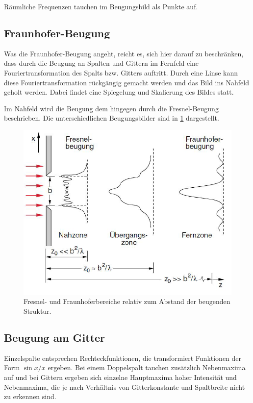 \documentclass[
	a4paper,
	12pt,
	pagesize,
	ngerman
]{scrartcl}
\begin{document}
	Räumliche Frequenzen tauchen im Beugungsbild als Punkte auf.

	\subsection{Fraunhofer-Beugung}
	\label{sec_fraunhofer}

	Was die Fraunhofer-Beugung angeht, reicht es, sich hier darauf zu beschränken, dass durch die Beugung an Spalten und Gittern im Fernfeld eine Fouriertransformation des Spalts bzw. Gitters auftritt.
	Durch eine Linse kann diese Fouriertransformation rückgängig gemacht werden und das Bild ins Nahfeld geholt werden.
	Dabei findet eine Spiegelung und Skalierung des Bildes statt.

	Im Nahfeld wird die Beugung dem hingegen durch die Fresnel-Beugung beschrieben.
	\cite{Anleitung}
	Die unterschiedlichen Beugungsbilder sind in \cref{fig_fraunfresnel} dargestellt.

	\begin{figure}[H]
			\includegraphics[width=0.75\linewidth]{img/fraunfresnel}
			\caption{
				Fresnel- und Fraunhoferbereiche relativ zum Abstand der beugenden Struktur. \cite{Anleitung}
			}
			\label{fig_fraunfresnel}
	\end{figure}

	\subsection{Beugung am Gitter}
	\label{sec_gitterbeug}

	Einzelspalte entsprechen Rechteckfunktionen, die transformiert Funktionen der Form $\sin{x}/x$ ergeben.
	Bei einem Doppelspalt tauchen zusätzlich Nebenmaxima auf und bei Gittern ergeben sich einzelne Hauptmaxima hoher Intensität und Nebenmaxima, die je nach Verhältnis von Gitterkonstante und Spaltbreite nicht zu erkennen sind.
\end{document}
